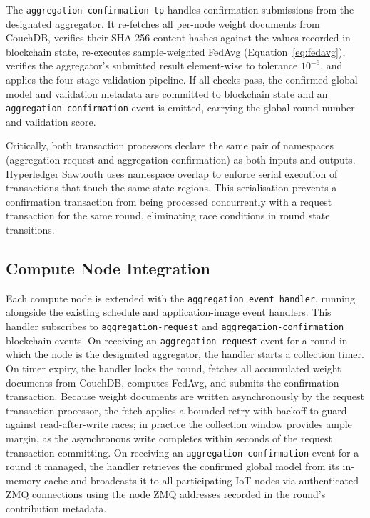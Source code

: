 \documentclass[lettersize,journal]{IEEEtran}
\begin{document}
The \texttt{aggregation-confirmation-tp} handles confirmation submissions from the
designated aggregator. It re-fetches all per-node weight documents from CouchDB, verifies
their SHA-256 content hashes against the values recorded in blockchain state, re-executes
sample-weighted FedAvg (Equation~\eqref{eq:fedavg}), verifies the aggregator's submitted
result element-wise to tolerance $10^{-6}$, and applies the four-stage validation pipeline.
If all checks pass, the confirmed global model and validation metadata are committed to
blockchain state and an \texttt{aggregation-confirmation} event is emitted, carrying
the global round number and validation score.

Critically, both transaction processors declare the same pair of namespaces (aggregation
request and aggregation confirmation) as both inputs and outputs. Hyperledger Sawtooth
uses namespace overlap to enforce serial execution of transactions that touch the same
state regions. This serialisation prevents a confirmation transaction from being processed
concurrently with a request transaction for the same round, eliminating race conditions
in round state transitions.

\subsection{Compute Node Integration}

Each compute node is extended with the \texttt{aggregation\_event\_handler}, running
alongside the existing schedule and application-image event handlers. This handler
subscribes to \texttt{aggregation-request} and \texttt{aggregation-confirmation}
blockchain events. On receiving an \texttt{aggregation-request} event for a round in which
the node is the designated aggregator, the handler starts a collection timer. On timer
expiry, the handler locks the round, fetches all accumulated weight documents from CouchDB,
computes FedAvg, and submits the confirmation transaction. Because weight documents are
written asynchronously by the request transaction processor, the fetch applies a bounded
retry with backoff to guard against read-after-write races; in practice the collection
window provides ample margin, as the asynchronous write completes within seconds of the
request transaction committing. On receiving an
\texttt{aggregation-confirmation} event for a round it managed, the handler retrieves the
confirmed global model from its in-memory cache and broadcasts it to all participating
IoT nodes via authenticated ZMQ connections using the node ZMQ addresses recorded in the
round's contribution metadata.
\end{document}
